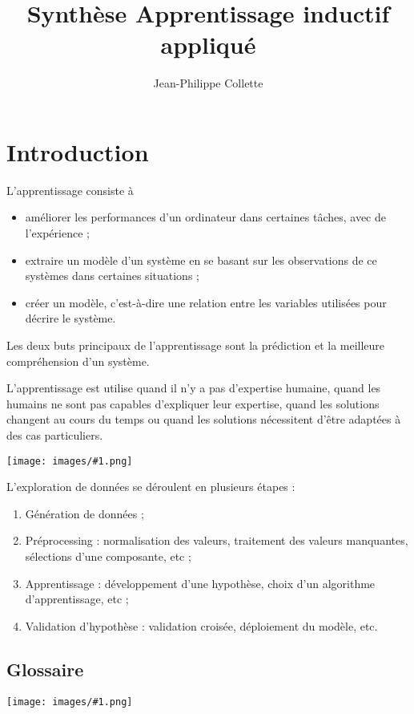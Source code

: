 \documentclass[10pt,a4paper]{report}
\title{Synthèse Apprentissage inductif appliqué}
\author{Jean-Philippe Collette}
\newcommand{\dessin}[1]{\begin{center}\texttt{[image: images/\#1.png]}\end{center}}
\begin{document}
	
	\maketitle
	\tableofcontents
	
\chapter{Introduction}

L'apprentissage consiste à

\begin{itemize}
	\item améliorer les performances d'un ordinateur dans certaines tâches, avec de l'expérience ;
	\item extraire un modèle d'un système en se basant sur les observations de ce systèmes dans certaines situations ;
	\item créer un modèle, c'est-à-dire une relation entre les variables utilisées pour décrire le système.
\end{itemize}

Les deux buts principaux de l'apprentissage sont la prédiction et la meilleure compréhension d'un système.

L'apprentissage est utilise quand il n'y a pas d'expertise humaine, quand les humains ne sont pas capables d'expliquer leur expertise, quand les solutions changent au cours du temps ou quand les solutions nécessitent d'être adaptées à des cas particuliers.

\dessin{1}

L'exploration de données se déroulent en plusieurs étapes :

\begin{enumerate}
	\item Génération de données ;
	\item Préprocessing : normalisation des valeurs, traitement des valeurs manquantes, sélections d'une composante, etc ;
	\item Apprentissage : développement d'une hypothèse, choix d'un algorithme d'apprentissage, etc ;
	\item Validation d'hypothèse : validation croisée, déploiement du modèle, etc.
\end{enumerate}

	\section{Glossaire}
	
	\dessin{2}
\end{document}
